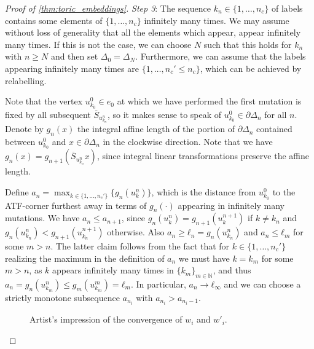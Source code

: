 \documentclass[12pt,a4paper,abstract=true,final]{scrartcl}
\begin{document}
\begin{proof}[Proof of \cref{thm:toric_embeddings}]
  \emph{Step 3}: The sequence $k_n ∈ \{1,…,n_c\}$ of labels contains some elements of $\{1,…,n_c\}$ infinitely many times.
  We may assume without loss of generality that all the elements which appear, appear infinitely many times. If this is not the case, we can choose $N$ such that this holds for $k_n$ with $n≥N$ and then set $Δ_0=Δ_N$. Furthermore, we can assume that the labels appearing infinitely many times are $\{1,…,n_c'≤n_c\}$, which can be achieved by relabelling.

  Note that the vertex $u_{k_0}^0 ∈ e_0$ at which we have performed the first mutation is fixed by all subsequent $\overline{S}_{u_{k_n}^n}$, so it makes sense to speak of $u_{k_0}^0 ∈ ∂Δ_n$ for all $n$.
  Denote by $g_n(x)$ the integral affine length of the portion of $\partial \Delta_n$ contained between $u_{k_0}^0$ and $x ∈ ∂Δ_n$ in the clockwise direction.
Note that we have $g_n(x) = g_{n+1}(\overline{S}_{u_{k_n}^n}x)$, since integral linear transformations preserve the affine length.

  Define $a_n = \max_{k ∈\{1,…,n_c'\}} \{g_n(u_k^n)\}$, which is the distance from $u_{k_0}^0$ to the  ATF-corner furthest away in terms of $g_n(\cdot)$ appearing in infinitely many mutations.
We have $a_n ≤ a_{n+1}$, since $g_n(u_k^n) = g_{n+1}(u_k^{n+1})$ if $k ≠ k_n$ and $g_n(u_{k_n}^n) < g_{n+1}(u_{k_n}^{n+1})$ otherwise.
Also $a_n ≥ ℓ_n = g_n(u_{k_n}^n)$ and $a_n ≤ ℓ_m$ for some $m>n$.
The latter claim follows from the fact that for $k ∈ \{1, …, n_c'\}$ realizing the maximum in the definition of $a_n$ we must have $k = k_m$ for some $m>n$, as $k$ appears infinitely many times in $\{k_m\}_{m ∈ ℕ}$, and thus $a_n = g_n(u^n_{k_m}) ≤ g_m(u^m_{k_m}) = ℓ_m$.
In particular, $a_n → ℓ_∞$ and we can choose a strictly monotone subsequence $a_{n_i}$ with $a_{n_i} > a_{n_i-1}$.

  \begin{figure}
    \centering
    \caption{Artist's impression of the convergence of $w_i$ and $w'_i$.}
    \label{fig:stretch_wi}
  \end{figure}


\end{proof}
\end{document}
